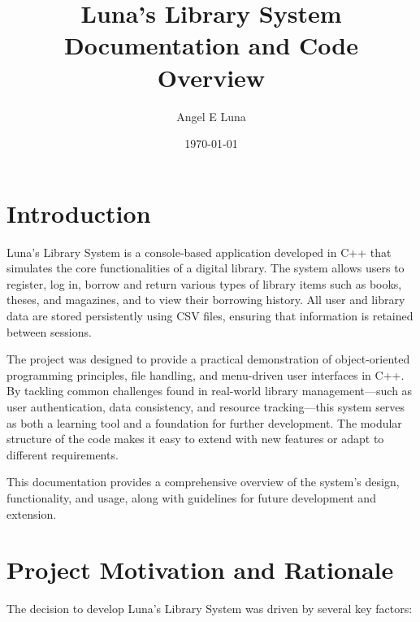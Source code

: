 \documentclass[a4paper,12pt]{article}
\title{Luna's Library System \\
\vspace{0.5em}
\large Documentation and Code Overview}
\author{Angel E Luna}
\date{\today}
\begin{document}
\maketitle

\tableofcontents

\section{Introduction}

Luna's Library System is a console-based application developed in C++ that simulates the core functionalities of a digital library. The system allows users to register, log in, borrow and return various types of library items such as books, theses, and magazines, and to view their borrowing history. All user and library data are stored persistently using CSV files, ensuring that information is retained between sessions.

The project was designed to provide a practical demonstration of object-oriented programming principles, file handling, and menu-driven user interfaces in C++. By tackling common challenges found in real-world library management—such as user authentication, data consistency, and resource tracking—this system serves as both a learning tool and a foundation for further development. The modular structure of the code makes it easy to extend with new features or adapt to different requirements.

This documentation provides a comprehensive overview of the system's design, functionality, and usage, along with guidelines for future development and extension.

\section{Project Motivation and Rationale}

The decision to develop Luna's Library System was driven by several key factors:
\end{document}
